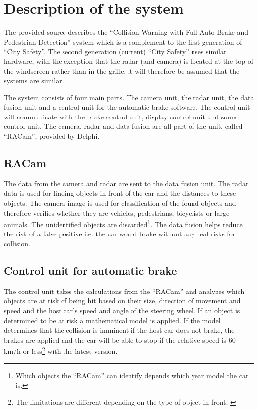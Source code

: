 \documentclass[conference]{IEEEtran}
\begin{document}

\section{Description of the system}
The provided source describes the ``Collision Warning with Full Auto Brake and Pedestrian Detection'' system which is a complement to the first generation of ``City Safety''. The second generation (current) ``City Safety'' uses similar hardware, with the exception that the radar (and camera) is located at the top of the windscreen rather than in the grille, it will therefore be assumed that the systems are similar. \cite{SysDescription,RACam,DelphiVolvo}

The system consists of four main parts. The camera unit, the radar unit, the data fusion unit and a control unit for the automatic brake software. The control unit will communicate with the brake control unit, display control unit and sound control unit. The camera, radar and data fusion are all part of the unit, called ``RACam'', provided by Delphi. \cite{SysDescription,DelphiVolvo}

\subsection{RACam}
The data from the camera and radar are sent to the data fusion unit. The radar data is used for finding objects in front of the car and the distances to these objects. The camera image is used for classification of the found objects and therefore verifies whether they are vehicles, pedestrians, bicyclists or large animals. The unidentified objects are discarded\footnote{Which objects the ``RACam'' can identify depends which year model the car is.}. The data fusion helps reduce the risk of a false positive i.e. the car would brake without any real risks for collision. \cite{SysDescription}

\subsection{Control unit for automatic brake}
The control unit takes the calculations from the ``RACam'' and analyzes which objects are at risk of being hit based on their size, direction of movement and speed and the host car's speed and angle of the steering wheel. If an object is determined to be at risk a mathematical model is applied. If the model determines that the collision is imminent if the host car does not brake, the brakes are applied and the car will be able to stop if the relative speed is 60 km/h or less\footnote{The limitations are different depending on the type of object in front. \cite{CitySafetyDefinition}} with the latest version. \cite{SysDescription, CitySafetyDefinition}
\end{document}
